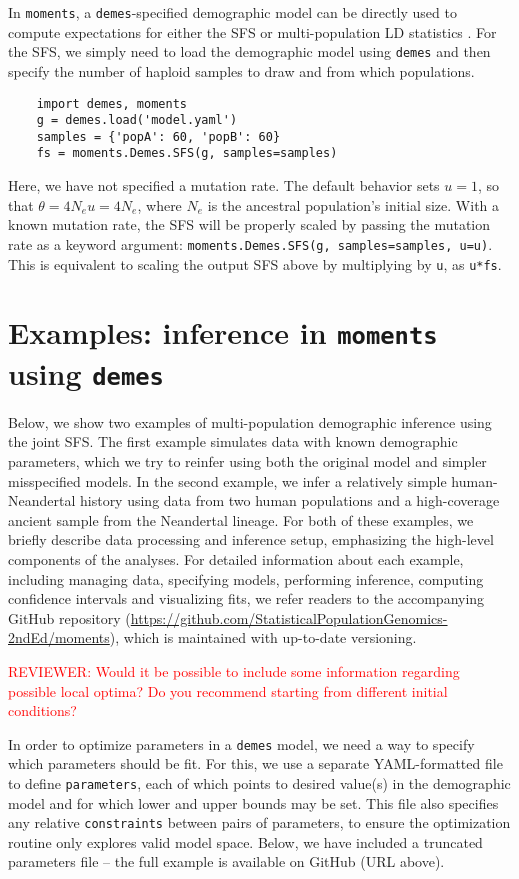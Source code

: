 \documentclass[]{article}
\newcommand{\reviewercomment}[1]{{\textcolor{red}{REVIEWER: #1}}}
\newcommand{\moments}{\texttt{moments}\xspace}
\newcommand{\demes}{\texttt{demes}\xspace}
\begin{document}
In \moments, a \demes-specified demographic model can be directly used to
compute expectations for either the SFS or multi-population LD statistics
\cite{ragsdale2019models, ragsdale2020unbiased}. For the SFS, we simply need
to load the demographic model using \demes and then specify the number of
haploid samples to draw and from which populations.
\begin{verbatim}
    import demes, moments
    g = demes.load('model.yaml')
    samples = {'popA': 60, 'popB': 60}
    fs = moments.Demes.SFS(g, samples=samples)
\end{verbatim}
Here, we have not specified a mutation rate. The default behavior sets $u=1$,
so that $\theta = 4N_eu=4N_e$, where $N_e$ is the ancestral population's
initial size. With a known mutation rate, the SFS will be properly scaled by
passing the mutation rate as a keyword argument: \texttt{moments.Demes.SFS(g,
samples=samples, u=u)}. This is equivalent to scaling the output SFS above by
multiplying by \texttt{u}, as \texttt{u*fs}.

\section*{Examples: inference in \moments using \demes}

Below, we show two examples of multi-population demographic inference using the
joint SFS. The first example simulates data with known demographic parameters,
which we try to reinfer using both the original model and simpler
misspecified models. In the second example, we infer a relatively simple
human-Neandertal history using data from two human populations and a
high-coverage ancient sample from the Neandertal lineage. For both of these
examples, we briefly describe data processing and inference setup, emphasizing
the high-level components of the analyses. For detailed information about each
example, including managing data, specifying models, performing inference,
computing confidence intervals and visualizing fits, we refer readers to the
accompanying GitHub repository
(\url{https://github.com/StatisticalPopulationGenomics-2ndEd/moments}), which
is maintained with up-to-date versioning.

\reviewercomment{Would it be possible to include some information regarding possible local optima? Do you recommend starting from different initial conditions?}

In order to optimize parameters in a \demes model, we need a way to specify
which parameters should be fit. For this, we use a separate YAML-formatted file
to define \texttt{parameters}, each of which points to desired value(s) in the
demographic model and for which lower and upper bounds may be set. This file
also specifies any relative \texttt{constraints} between pairs of parameters,
to ensure the optimization routine only explores valid model space. Below, we
have included a truncated parameters file -- the full example is available on
GitHub (URL above).
\end{document}
